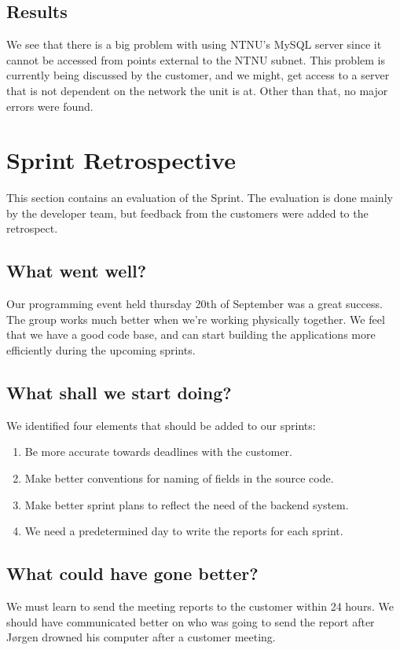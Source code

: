 \subsection{Results}
We see that there is a big problem with using NTNU's MySQL server since it cannot be accessed
from points external to the NTNU subnet. This problem is currently being discussed by the 
customer, and we might, get access to a server that is not dependent on the network the unit 
is at. Other than that, no major errors were found.

\section{Sprint Retrospective}
\label{sec:sprint2sprintRetrospective}
This section contains an evaluation of the Sprint. The evaluation is done mainly
by the developer team, but feedback from the customers were added to the
retrospect.

\subsection*{What went well?}
Our programming event held thursday 20th of September was a great success. The
group works much better when we're working physically together. We feel that we
have a good code base, and can start building the applications more efficiently
during the upcoming sprints. 

\subsection*{What shall we start doing?}
We identified four elements that should be added to our sprints:
\begin{enumerate}
  \item Be more accurate towards deadlines with the customer.
  \item Make better conventions for naming of fields in the source code.
  \item Make better sprint plans to reflect the need of the backend system.
  \item We need a predetermined day to write the reports for each sprint. 
\end{enumerate}

\subsection*{What could have gone better?}
We must learn to send the meeting reports to the customer within 24 hours. We
should have communicated better on who was going to send the report after J\o rgen
drowned his computer after a customer meeting. 


